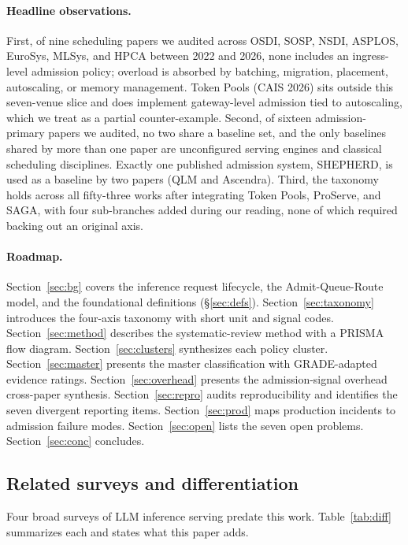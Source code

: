 \documentclass[11pt,letterpaper]{article}
\theoremstyle{definition}
\begin{document}
\paragraph{Headline observations.} First, of nine scheduling papers
we audited across OSDI, SOSP, NSDI, ASPLOS, EuroSys, MLSys, and HPCA
between 2022 and 2026, none includes an ingress-level admission
policy; overload is absorbed by batching, migration, placement,
autoscaling, or memory management. Token Pools (CAIS 2026) sits
outside this seven-venue slice and does implement gateway-level
admission tied to autoscaling, which we treat as a partial
counter-example. Second, of sixteen admission-primary papers we
audited, no two share a baseline set, and the only
baselines shared by more than one paper are unconfigured serving engines
and classical scheduling disciplines. Exactly one published admission
system, SHEPHERD, is used as a baseline by two papers (QLM and
Ascendra). Third, the taxonomy holds across all fifty-three
works after integrating Token Pools, ProServe, and SAGA, with four
sub-branches added during our reading, none of which required
backing out an original axis.

\paragraph{Roadmap.} Section~\ref{sec:bg} covers the inference request
lifecycle, the Admit-Queue-Route model, and the foundational
definitions (\S\ref{sec:defs}). Section~\ref{sec:taxonomy} introduces
the four-axis taxonomy with short unit and signal codes.
Section~\ref{sec:method} describes the systematic-review method with a
PRISMA flow diagram. Section~\ref{sec:clusters} synthesizes each
policy cluster. Section~\ref{sec:master} presents the master
classification with GRADE-adapted evidence ratings.
Section~\ref{sec:overhead} presents the admission-signal overhead
cross-paper synthesis. Section~\ref{sec:repro} audits reproducibility
and identifies the seven divergent reporting items. Section~\ref{sec:prod} maps
production incidents to admission failure modes.
Section~\ref{sec:open} lists the seven open problems.
Section~\ref{sec:conc} concludes.

\subsection{Related surveys and differentiation}

Four broad surveys of LLM inference serving predate this work.
Table~\ref{tab:diff} summarizes each and states what this paper adds.
\end{document}
